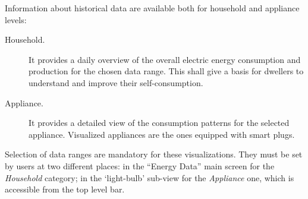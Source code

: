 Information about historical data are available both for household and appliance levels:
\begin{description}
 \item[Household.] It provides a daily overview of the overall electric energy consumption and production for the chosen data range. This shall give a basis for dwellers to understand and improve their self-consumption.
 \item[Appliance.] It provides a detailed view of the consumption patterns for the selected appliance. Visualized appliances are the ones equipped with smart plugs. 
\end{description}
Selection of data ranges are mandatory for these visualizations. They must be set by users at two different places: in the ``Energy Data'' main screen for the \textit{Household} category;
in the `light-bulb' sub-view for the \textit{Appliance} one, which is accessible from the top level bar.


